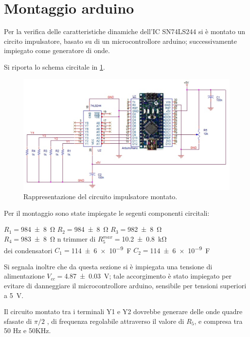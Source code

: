 \section{Montaggio arduino}
Per la verifica delle caratteristiche dinamiche dell'IC SN74LS244 si è montato un circito impulsatore, basato su di un microcontrollore arduino; successivamente impiegato come generatore di onde. 

Si riporta lo schema circitale in \figurename{ \ref{f:impulsatore}}. 

\begin{figure}[htb]
	\includegraphics[scale=0.50]{../Figs-Tabs/imp.png}
	\caption{Rappresentazione del circuito impulsatore montato.}
	\label{f:impulsatore}
\end{figure}
Per il montaggio sono state impiegate le  segenti componenti circitali:
\begin{center}
	\bigskip
	$R_{1}=$\SI{984 \pm 8}{\ohm} $R_{2}=$\SI{984 \pm 8}{\ohm} $R_{3}=$\SI{982 \pm 8}{\ohm} \\
	$R_{4}=$\SI{983 \pm 8}{\ohm} n trimmer di $R_{5}^{max}=$\SI{10.2 \pm 0.8}{\kilo \ohm} \\
	dei condensatori	$C_{1}=$\SI{114 \pm 6 e-9}{\farad} $C_{2}=$\SI{114  \pm 6 e-9}{\farad}
	
\end{center}
Si segnala inoltre 
che da questa sezione si è impiegata una tensione di alimentazione $V_{cc}=$\SI{4.87 \pm 0.03}{\volt}; tale accorgimento è stato impiegato per evitare di danneggiare il microcontrollore arduino, sensibile per tensioni superiori a \SI{5}{\volt}.

Il circuito montato tra i terminali Y1 e Y2 dovrebbe generare delle onde quadre sfasate di $\pi/2$ , di frequenza regolabile attraverso il valore di $R_{5}$, e  compresa tra 50 Hz e 50KHz.

